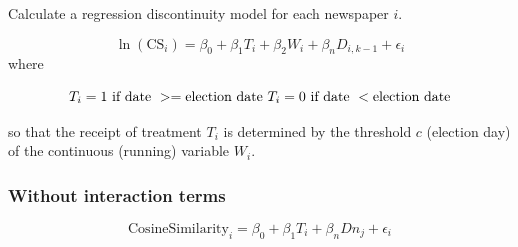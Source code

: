 \documentclass[
]{article}
\begin{document}
Calculate a regression discontinuity model for each newspaper \(i\).

\[
\ln(\text{CS}_{i})=\beta_0+\beta_1T_i+\beta_2W_{i}+\beta_nD_{i,k-1}+\epsilon_i
\] where

\[
T_i = 1 \text{ if date } >= \text{election date} \\\
T_i = 0 \text{ if date } < \text{election date}
\]

so that the receipt of treatment \(T_i\) is determined by the threshold
\(c\) (election day) of the continuous (running) variable \(W_i\).

\hypertarget{without-interaction-terms}{%
\subsubsection{Without interaction
terms}\label{without-interaction-terms}}

\[
\text{CosineSimilarity}_{i}=\beta_0+\beta_1T_i+\beta_nDn_{j}+\epsilon_i
\]
\end{document}
